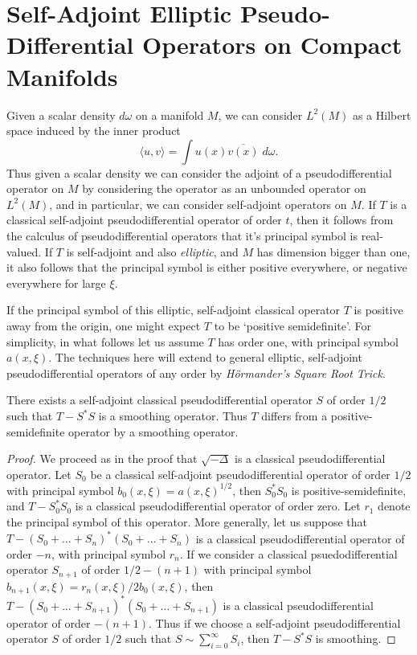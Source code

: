 \section{Self-Adjoint Elliptic Pseudo-Differential Operators on Compact Manifolds}

Given a scalar density $d\omega$ on a manifold $M$, we can consider $L^2(M)$ as a Hilbert space induced by the inner product
%
\[ \langle u, v \rangle = \int u(x) \overline{v(x)}\; d\omega. \]
%
Thus given a scalar density we can consider the adjoint of a pseudodifferential operator on $M$ by considering the operator as an unbounded operator on $L^2(M)$, and in particular, we can consider self-adjoint operators on $M$. If $T$ is a classical self-adjoint pseudodifferential operator of order $t$, then it follows from the calculus of pseudodifferential operators that it's principal symbol is real-valued. If $T$ is self-adjoint and also \emph{elliptic}, and $M$ has dimension bigger than one, it also follows that the principal symbol is either positive everywhere, or negative everywhere for large $\xi$.

If the principal symbol of this elliptic, self-adjoint classical operator $T$ is positive away from the origin, one might expect $T$ to be `positive semidefinite'. For simplicity, in what follows let us assume $T$ has order one, with principal symbol $a(x,\xi)$. The techniques here will extend to general elliptic, self-adjoint pseudodifferential operators of any order by \emph{H\"{o}rmander's Square Root Trick}.

\begin{lemma}
    There exists a self-adjoint classical pseudodifferential operator $S$ of order $1/2$ such that $T - S^* S$ is a smoothing operator. Thus $T$ differs from a positive-semidefinite operator by a smoothing operator.
\end{lemma}
\begin{proof}
    We proceed as in the proof that $\sqrt{-\Delta}$ is a classical pseudodifferential operator. Let $S_0$ be a classical self-adjoint pseudodifferential operator of order $1/2$ with principal symbol $b_0(x,\xi) = a(x,\xi)^{1/2}$, then $S_0^* S_0$ is positive-semidefinite, and $T - S_0^* S_0$ is a classical pseudodifferential operator of order zero. Let $r_1$ denote the principal symbol of this operator. More generally, let us suppose that $T - (S_0 + \dots + S_n)^* (S_0 + \dots + S_n)$ is a classical pseudodifferential operator of order $-n$, with principal symbol $r_n$. If we consider a classical psuedodifferential operator $S_{n+1}$ of order $1/2 - (n+1)$ with principal symbol $b_{n+1}(x,\xi) = r_n(x,\xi) / 2 b_0(x,\xi)$, then $T - (S_0 + \dots + S_{n+1})^* (S_0 + \dots + S_{n+1})$ is a classical pseudodifferential operator of order $-(n+1)$. Thus if we choose a self-adjoint pseudodifferential operator $S$ of order $1/2$ such that $S \sim \sum_{i = 0}^\infty S_i$, then $T - S^* S$ is smoothing. 
\end{proof}

